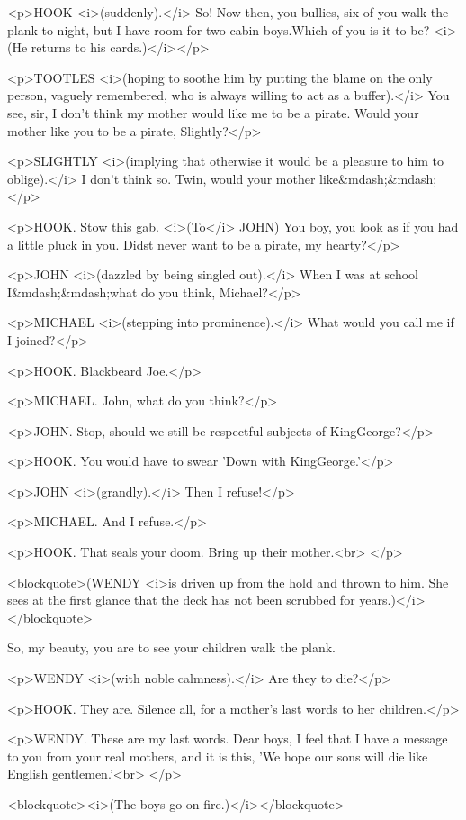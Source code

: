<p>HOOK <i>(suddenly).</i> So! Now then, you bullies, six of you walk
the plank to-night, but I have room for two cabin-boys.Which of you
is it to be? <i>(He returns to his cards.)</i></p>

<p>TOOTLES <i>(hoping to soothe him by putting the blame on the only
person, vaguely remembered, who is always willing to act as a
buffer).</i> You see, sir, I don't think my mother would like me to
be a pirate. Would your mother like you to be a pirate, Slightly?</p>

<p>SLIGHTLY <i>(implying that otherwise it would be a pleasure to him
to oblige).</i> I don't think so. Twin, would your mother
like&mdash;&mdash;</p>

<p>HOOK. Stow this gab. <i>(To</i> JOHN) You boy, you look as if you
had a little pluck in you. Didst never want to be a pirate, my
hearty?</p>

<p>JOHN <i>(dazzled by being singled out).</i> When I was at school
I&mdash;&mdash;what do you think, Michael?</p>

<p>MICHAEL <i>(stepping into prominence).</i> What would you call me
if I joined?</p>

<p>HOOK. Blackbeard Joe.</p>

<p>MICHAEL. John, what do you think?</p>

<p>JOHN. Stop, should we still be respectful subjects of
KingGeorge?</p>

<p>HOOK. You would have to swear 'Down with KingGeorge.'</p>

<p>JOHN <i>(grandly).</i> Then I refuse!</p>

<p>MICHAEL. And I refuse.</p>

<p>HOOK. That seals your doom. Bring up their mother.<br>
</p>

<blockquote>(WENDY <i>is driven up from the hold and thrown to him.
She sees at the first glance that the deck has not been scrubbed for
years.)</i></blockquote>

So, my beauty, you are to see your children walk the plank. 

<p>WENDY <i>(with noble calmness).</i> Are they to die?</p>

<p>HOOK. They are. Silence all, for a mother's last words to her
children.</p>

<p>WENDY. These are my last words. Dear boys, I feel that I have a
message to you from your real mothers, and it is this, 'We hope our
sons will die like English gentlemen.'<br>
</p>

<blockquote><i>(The boys go on fire.)</i></blockquote>

